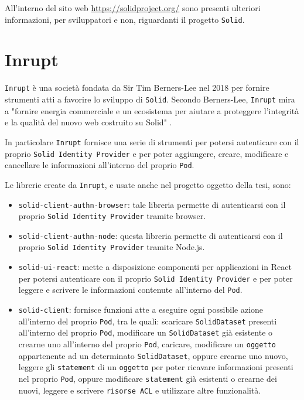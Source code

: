 \bigskip
\bigskip
\bigskip
\bigskip

All'interno del sito web \href{https://solidproject.org/}{https://solidproject.org/} sono presenti ulteriori informazioni, per sviluppatori e non, riguardanti il progetto {\tt Solid}.

\bigskip

\section{Inrupt}

\medskip

{\tt Inrupt} è una società fondata da Sir Tim Berners-Lee nel 2018 per fornire strumenti atti a favorire lo sviluppo di {\tt Solid}. Secondo Berners-Lee, {\tt Inrupt} mira a "fornire energia commerciale e un ecosistema per aiutare a proteggere l'integrità e la qualità del nuovo web costruito su Solid" \cite{inrupt}.

\medskip

In particolare {\tt Inrupt} fornisce una serie di strumenti per potersi autenticare con il proprio {\tt Solid Identity Provider} e per poter aggiungere, creare, modificare e cancellare le informazioni all'interno del proprio {\tt Pod}.

\medskip

Le librerie create da {\tt Inrupt}, e usate anche nel progetto oggetto della tesi, sono:

\begin{itemize}
	\item {\tt solid-client-authn-browser}: tale libreria permette di autenticarsi con il proprio {\tt Solid Identity Provider} tramite browser.
	\item {\tt solid-client-authn-node}: questa libreria permette di autenticarsi con il proprio {\tt Solid Identity Provider} tramite Node.js.
	\item {\tt solid-ui-react}: mette a disposizione componenti per applicazioni in React per potersi autenticare con il proprio {\tt Solid Identity Provider} e per poter leggere e scrivere le informazioni contenute all'interno del {\tt Pod}.
	\item {\tt solid-client}: fornisce funzioni atte a eseguire ogni possibile azione all'interno del proprio {\tt Pod}, tra le quali: scaricare {\tt SolidDataset} presenti all'interno del proprio {\tt Pod}, modificare un {\tt SolidDataset} già esistente o crearne uno all'interno del proprio {\tt Pod}, caricare, modificare un {\tt oggetto} appartenente ad un determinato {\tt SolidDataset}, oppure crearne uno nuovo, leggere gli {\tt statement} di un {\tt oggetto} per poter ricavare informazioni presenti nel proprio {\tt Pod}, oppure modificare {\tt statement} già esistenti o crearne dei nuovi, leggere e scrivere {\tt risorse ACL} e utilizzare altre funzionalità.
\end{itemize}

